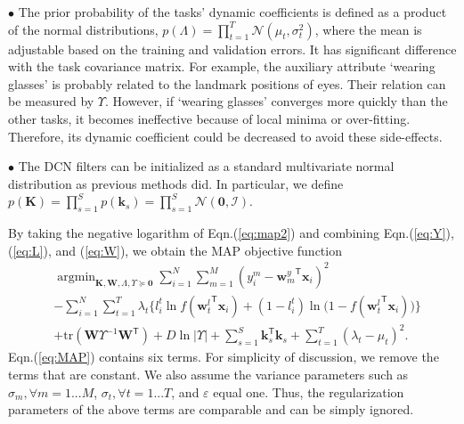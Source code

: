 \documentclass[10pt,journal,compsoc]{IEEEtran}
\newcommand{\x} {\textbf{x}}
\newcommand{\w} {\textbf{w}}
\newcommand{\W} {\textbf{W}}
\newcommand{\K} {\textbf{K}}
\newcommand{\kk} {\textbf{k}}
\DeclareMathOperator*{\argmin}{argmin}
\newcommand{\trans}[1]{{#1}^{\ensuremath{\mathsf{T}}}}
\begin{document}
$\bullet$ The prior probability of the tasks' dynamic coefficients is defined as a product of the normal
distributions, $p(\Lambda)=\prod_{t=1}^T \mathcal{N}(\mu_t,\sigma_t^2)$, where the mean is adjustable based on the training and validation errors. It has significant difference with the task covariance matrix.
For example, the auxiliary attribute `wearing glasses' is probably related to the landmark positions of eyes. Their relation can be measured by $\Upsilon$. However, if `wearing glasses' converges more quickly than the other tasks, it becomes ineffective because of local minima or over-fitting. Therefore, its dynamic coefficient could be decreased to avoid these side-effects.

$\bullet$ The DCN filters can be initialized as a standard multivariate normal distribution as previous methods \cite{krizhevsky2012imagenet} did. In particular, we define $p(\K)=\prod_{s=1}^Sp(\kk_s)=\prod_{s=1}^S\mathcal{N}(\textbf{0},\mathcal{I})$.

By taking the negative logarithm of Eqn.(\ref{eq:map2}) and combining Eqn.(\ref{eq:Y}), (\ref{eq:L}), and (\ref{eq:W}), we obtain the MAP objective function
\begin{equation}\label{eq:MAP}
\begin{split}
&\argmin_{\K,\W,\Lambda,\Upsilon\succeq\textbf{0}}\sum_{i=1}^N\sum_{m=1}^M(y_i^m-\trans{\w^y_m}\x_i)^2\\
&-\sum_{i=1}^N\sum_{t=1}^T\lambda_t\Big\{ l^t_i\ln f(\trans{\w^l_t}\x_i)+(1-l^t_i)\ln\big(1-f(\trans{\w^l_t}\x_i)\big)\Big\}
\\
&+\mathrm{tr}(\W\Upsilon^{-1}\trans{\W})+D\ln|\Upsilon|
+\sum_{s=1}^S\trans{\kk}_s\kk_s+\sum_{t=1}^T(\lambda_t-\mu_t)^2.
\end{split}
\end{equation}
Eqn.(\ref{eq:MAP}) contains six terms. For simplicity of discussion, we remove the terms that are constant. We also assume the variance parameters such as $\sigma_m, \forall m=1...M$, $\sigma_t,\forall t=1...T$, and $\varepsilon$ equal one. Thus, the regularization parameters of the above terms are comparable and can be simply ignored.
\end{document}
